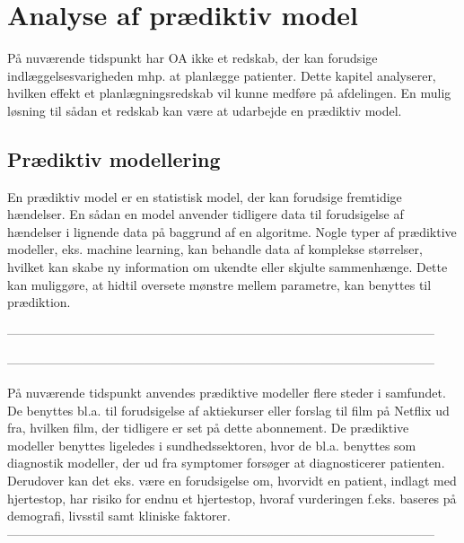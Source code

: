 \chapter{Analyse af prædiktiv model}
På nuværende tidspunkt har OA ikke et redskab, der kan forudsige indlæggelsesvarigheden mhp. at planlægge patienter. Dette kapitel analyserer, hvilken effekt et planlægningsredskab vil kunne medføre  på afdelingen. En mulig løsning til sådan et redskab kan være at udarbejde en prædiktiv model. 


\section{Prædiktiv modellering} \label{praemodel}
En prædiktiv model er en statistisk model, der kan forudsige fremtidige hændelser. En sådan en model anvender tidligere data til forudsigelse af hændelser i lignende data på baggrund af en algoritme. Nogle typer af prædiktive modeller, eks. machine learning, kan behandle data af komplekse størrelser, hvilket kan skabe ny information om ukendte eller skjulte sammenhænge. Dette kan muliggøre, at hidtil oversete mønstre mellem parametre, kan benyttes til prædiktion. 


------------------------------------------------------------------------------------------------------


------------------------------------------------------------------------------------------------------

På nuværende tidspunkt anvendes prædiktive modeller flere steder i samfundet. De benyttes bl.a. til forudsigelse af aktiekurser eller forslag til film på Netflix ud fra, hvilken film, der tidligere er set på dette abonnement.\cite{DIKU2012}
De prædiktive modeller benyttes ligeledes i sundhedssektoren, hvor de bl.a. benyttes som diagnostik modeller, der ud fra symptomer forsøger at diagnosticerer patienten.\cite{Kuhn2013} Derudover kan det eks. være en forudsigelse om, hvorvidt en patient, indlagt med hjertestop, har risiko for endnu et hjertestop, hvoraf vurderingen f.eks. baseres på demografi, livsstil samt kliniske faktorer\cite{Hastie2008}. 
------------------------------------------------------------------------------------------------------

